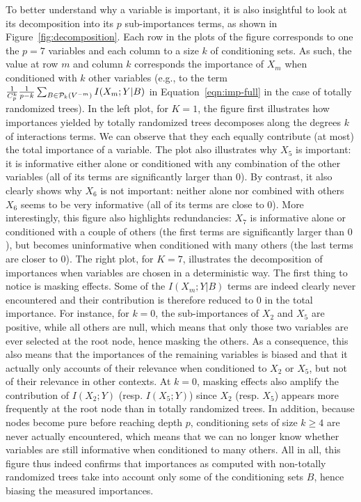 \documentclass{article}
\begin{document}
To better understand why a variable is important, it is also insightful to look
at its decomposition into its $p$ sub-importances terms, as shown in
Figure~\ref{fig:decomposition}. Each row in the plots of the figure corresponds
to one the $p=7$ variables and each column to a size $k$ of conditioning sets.
As such, the value at row $m$ and column $k$ corresponds the importance of $X_m$
when conditioned with $k$ other variables (e.g., to the term $\frac{1}{C^k_p}
\frac{1}{p-k} \sum_{B \in {\cal P}_k(V^{-m})} I(X_m;Y|B)$ in Equation~\ref{eqn:imp-full}
in the case of totally randomized trees). In the left plot, for
$K=1$, the figure first illustrates how importances yielded by totally
randomized trees decomposes along the degrees $k$ of interactions terms. We can
observe that they each equally contribute (at most) the total importance of a
variable. The plot also illustrates why $X_5$ is important: it is informative
either alone or conditioned with any combination of the other variables (all of
its terms are significantly larger than $0$). By contrast, it also clearly shows
why $X_6$ is not important: neither alone nor combined with others $X_6$ seems
to be very informative (all of its terms are close to $0$). More interestingly,
this figure also highlights redundancies: $X_7$ is informative alone or
conditioned with a couple of others (the first terms are significantly larger
than $0$), but becomes uninformative  when conditioned with
many others (the last terms are closer to $0$). The right plot, for $K=7$,
illustrates the decomposition of importances when variables are chosen in a
deterministic way. The first thing to notice is masking effects. Some of the
$I(X_m;Y|B)$ terms are indeed clearly never encountered and their contribution
is therefore reduced to $0$ in the total importance. For instance, for $k=0$,
the sub-importances of $X_2$ and $X_5$ are positive, while all others are null,
which means that only those two variables are ever selected at the root node,
hence masking the others. As a consequence, this also means that the importances
of the remaining variables is biased and that it actually only accounts of their
relevance when conditioned to $X_2$ or $X_5$, but not of their relevance in
other contexts. At $k=0$, masking effects also amplify the contribution of $I(X_2;Y)$
(resp. $I(X_5;Y)$) since $X_2$ (resp. $X_5$) appears more frequently at the root
node than in totally randomized trees. In addition, because nodes become pure
before reaching depth $p$, conditioning sets of size $k\geq4$ are never actually
encountered, which means that we can no longer know whether variables are still
informative when conditioned to many others. All in all, this figure thus indeed
confirms that importances as computed with non-totally randomized trees take
into account only some of the conditioning sets $B$, hence biasing the measured
importances.
\end{document}
